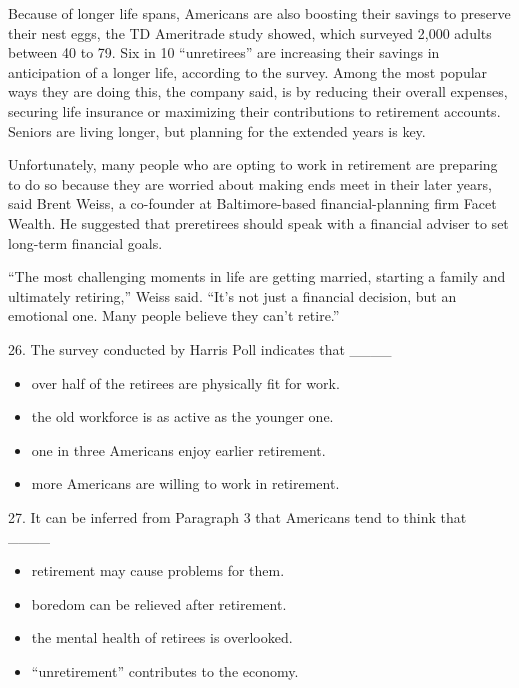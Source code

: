 \documentclass[UTF8,11pt]{ctexart}
\begin{document}
Because of longer life spans, Americans are also boosting their savings to preserve their nest eggs, the TD Ameritrade study showed, which surveyed 2,000 adults between 40 to 79. Six in 10 “unretirees” are increasing their savings in anticipation of a longer life, according to the survey. Among the most popular ways they are doing this, the company said, is by reducing their overall expenses, securing life insurance or maximizing their contributions to retirement accounts. Seniors are living longer, but planning for the extended years is key.


Unfortunately, many people who are opting to work in retirement are preparing to do so because they are worried about making ends meet in their later years, said Brent Weiss, a co-founder at Baltimore-based financial-planning firm Facet Wealth. He suggested that preretirees should speak with a financial adviser to set long-term financial goals.


“The most challenging moments in life are getting married, starting a family and ultimately retiring,” Weiss said. “It’s not just a financial decision, but an emotional one. Many people believe they can’t retire.”


26. The survey conducted by Harris Poll indicates that \_\_\_\_


\begin{itemize}[leftmargin=2em,itemsep=.2em,topsep=.4em]\item[A.] over half of the retirees are physically fit for work.
\item[B.] the old workforce is as active as the younger one.
\item[C.] one in three Americans enjoy earlier retirement.
\item[D.] more Americans are willing to work in retirement.
\end{itemize}

27. It can be inferred from Paragraph 3 that Americans tend to think that \_\_\_\_


\begin{itemize}[leftmargin=2em,itemsep=.2em,topsep=.4em]\item[A.] retirement may cause problems for them.
\item[B.] boredom can be relieved after retirement.
\item[C.] the mental health of retirees is overlooked.
\item[D.] “unretirement” contributes to the economy.
\end{itemize}
\end{document}
